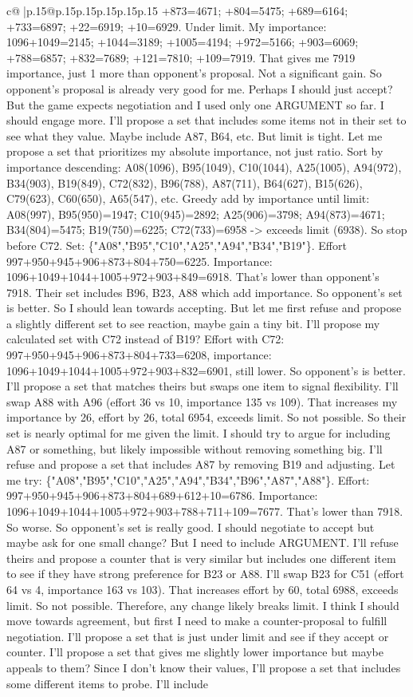 \documentclass{article}
\begin{document}
{\begin{supertabular}{c@{$\;$}|p{.15\linewidth}@{}p{.15\linewidth}p{.15\linewidth}p{.15\linewidth}p{.15\linewidth}p{.15\linewidth}}
{{{+873=4671; +804=5475; +689=6164; +733=6897; +22=6919; +10=6929. Under limit. My importance: 1096+1049=2145; +1044=3189; +1005=4194; +972=5166; +903=6069; +788=6857; +832=7689; +121=7810; +109=7919. That gives me 7919 importance, just 1 more than opponent's proposal. Not a significant gain. So opponent's proposal is already very good for me. Perhaps I should just accept? But the game expects negotiation and I used only one ARGUMENT so far. I should engage more. I'll propose a set that includes some items not in their set to see what they value. Maybe include A87, B64, etc. But limit is tight. Let me propose a set that prioritizes my absolute importance, not just ratio. Sort by importance descending: A08(1096), B95(1049), C10(1044), A25(1005), A94(972), B34(903), B19(849), C72(832), B96(788), A87(711), B64(627), B15(626), C79(623), C60(650), A65(547), etc. Greedy add by importance until limit: A08(997), B95(950)=1947; C10(945)=2892; A25(906)=3798; A94(873)=4671; B34(804)=5475; B19(750)=6225; C72(733)=6958 {-}> exceeds limit (6938). So stop before C72. Set: \{"A08","B95","C10","A25","A94","B34","B19"\}. Effort 997+950+945+906+873+804+750=6225. Importance: 1096+1049+1044+1005+972+903+849=6918. That's lower than opponent's 7918. Their set includes B96, B23, A88 which add importance. So opponent's set is better. So I should lean towards accepting. But let me first refuse and propose a slightly different set to see reaction, maybe gain a tiny bit. I'll propose my calculated set with C72 instead of B19? Effort with C72: 997+950+945+906+873+804+733=6208, importance: 1096+1049+1044+1005+972+903+832=6901, still lower. So opponent's is better. I'll propose a set that matches theirs but swaps one item to signal flexibility. I'll swap A88 with A96 (effort 36 vs 10, importance 135 vs 109). That increases my importance by 26, effort by 26, total 6954, exceeds limit. So not possible. So their set is nearly optimal for me given the limit. I should try to argue for including A87 or something, but likely impossible without removing something big. I'll refuse and propose a set that includes A87 by removing B19 and adjusting. Let me try: \{"A08","B95","C10","A25","A94","B34","B96","A87","A88"\}. Effort: 997+950+945+906+873+804+689+612+10=6786. Importance: 1096+1049+1044+1005+972+903+788+711+109=7677. That's lower than 7918. So worse. So opponent's set is really good. I should negotiate to accept but maybe ask for one small change? But I need to include ARGUMENT. I'll refuse theirs and propose a counter that is very similar but includes one different item to see if they have strong preference for B23 or A88. I'll swap B23 for C51 (effort 64 vs 4, importance 163 vs 103). That increases effort by 60, total 6988, exceeds limit. So not possible. Therefore, any change likely breaks limit. I think I should move towards agreement, but first I need to make a counter{-}proposal to fulfill negotiation. I'll propose a set that is just under limit and see if they accept or counter. I'll propose a set that gives me slightly lower importance but maybe appeals to them? Since I don't know their values, I'll propose a set that includes some different items to probe. I'll include }}}
\end{supertabular}}
\end{document}
